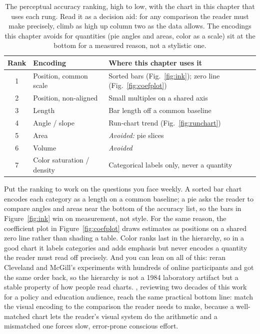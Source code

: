 \documentclass[
    a4paper,
    fontsize=10pt,
    twoside=true,
    numbers=noenddot,
]{kaobook}
\begin{document}
\begin{table}[htbp]
\centering
\caption[The Cleveland--McGill encoding ranking, mapped to this chapter]{The perceptual accuracy ranking, high to low, with the chart in this chapter that uses each rung. Read it as a decision aid: for any comparison the reader must make precisely, climb as high up column two as the data allows. The encodings this chapter avoids for quantities (pie angles and areas, color as a scale) sit at the bottom for a measured reason, not a stylistic one.}
\label{tab:ch09-viz-ranking}
\footnotesize
\begin{tabular}{@{}clp{9.6cm}@{}}
\toprule
Rank & Encoding & Where this chapter uses it \\
\midrule
1 & Position, common scale     & Sorted bars (Fig.~\ref{fig:ink}); zero line (Fig.~\ref{fig:coefplot}) \\
2 & Position, non-aligned      & Small multiples on a shared axis \\
3 & Length                     & Bar length off a common baseline \\
4 & Angle / slope              & Run-chart trend (Fig.~\ref{fig:runchart}) \\
5 & Area                       & \emph{Avoided:} pie slices \\
6 & Volume                     & \emph{Avoided} \\
7 & Color saturation / density & Categorical labels only, never a quantity \\
\bottomrule
\end{tabular}
\end{table}

Put the ranking to work on the questions you face weekly. A sorted bar chart encodes each category as a length on a common baseline; a pie asks the reader to compare angles and areas near the bottom of the accuracy list, so the bars in Figure~\ref{fig:ink} win on measurement, not style. For the same reason, the coefficient plot in Figure~\ref{fig:coefplot} draws estimates as positions on a shared zero line rather than shading a table. Color ranks last in the hierarchy, so in a good chart it labels categories and adds emphasis but never encodes a quantity the reader must read off precisely. And you can lean on all of this: \textcite{heer2010crowdsourcing} reran Cleveland and McGill's experiments with hundreds of online participants and got the same order back, so the hierarchy is not a 1984 laboratory artifact but a stable property of how people read charts. \textcite{franconeri2021science}, reviewing two decades of this work for a policy and education audience, reach the same practical bottom line: match the visual encoding to the comparison the reader needs to make, because a well-matched chart lets the reader's visual system do the arithmetic and a mismatched one forces slow, error-prone conscious effort.
\end{document}
